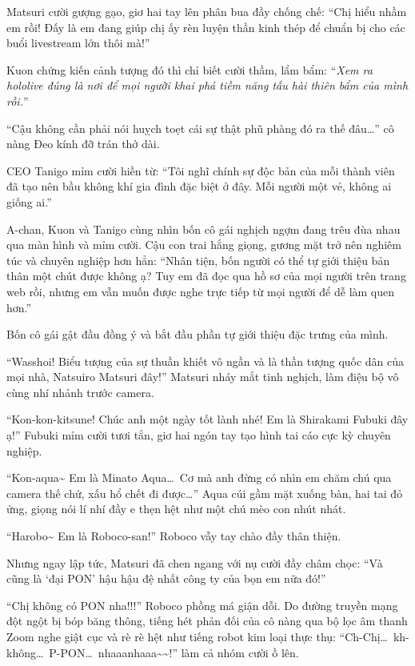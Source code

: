 \documentclass[../main.tex]{subfiles}
\begin{document}
Matsuri cười gượng gạo, giơ hai tay lên phân bua đầy chống chế: ``Chị hiểu nhầm em rồi! Đấy là em đang giúp chị ấy rèn luyện thần kinh thép để chuẩn bị cho các buổi livestream lớn thôi mà!''

Kuon chứng kiến cảnh tượng đó thì chỉ biết cười thầm, lẩm bẩm: ``\textit{Xem ra hololive đúng là nơi để mọi người khai phá tiềm năng tấu hài thiên bẩm của mình rồi.}''

``Cậu không cần phải nói huỵch toẹt cái sự thật phũ phàng đó ra thế đâu\dots'' cô nàng Đeo kính đỡ trán thở dài.

CEO Tanigo mỉm cười hiền từ: ``Tôi nghĩ chính sự độc bản của mỗi thành viên đã tạo nên bầu không khí gia đình đặc biệt ở đây. Mỗi người một vẻ, không ai giống ai.''

A-chan, Kuon và Tanigo cùng nhìn bốn cô gái nghịch ngợm đang trêu đùa nhau qua màn hình và mỉm cười. Cậu con trai hắng giọng, gương mặt trở nên nghiêm túc và chuyên nghiệp hơn hẳn: ``Nhân tiện, bốn người có thể tự giới thiệu bản thân một chút được không ạ? Tuy em đã đọc qua hồ sơ của mọi người trên trang web rồi, nhưng em vẫn muốn được nghe trực tiếp từ mọi người để dễ làm quen hơn.''

Bốn cô gái gật đầu đồng ý và bắt đầu phần tự giới thiệu đặc trưng của mình.

``Wasshoi! Biểu tượng của sự thuần khiết vô ngần và là thần tượng quốc dân của mọi nhà, Natsuiro Matsuri đây!'' Matsuri nháy mắt tinh nghịch, làm điệu bộ vô cùng nhí nhảnh trước camera.

``Kon-kon-kitsune! Chúc anh một ngày tốt lành nhé! Em là Shirakami Fubuki đây ạ!'' Fubuki mỉm cười tươi tắn, giơ hai ngón tay tạo hình tai cáo cực kỳ chuyên nghiệp.

``Kon-aqua\~{} Em là Minato Aqua\dots\ Cơ mà anh đừng có nhìn em chăm chú qua camera thế chứ, xấu hổ chết đi được\dots'' Aqua cúi gầm mặt xuống bàn, hai tai đỏ ửng, giọng nói lí nhí đầy e thẹn hệt như một chú mèo con nhút nhát.

``Harobo\~{} Em là Roboco-san!'' Roboco vẫy tay chào đầy thân thiện.

Nhưng ngay lập tức, Matsuri đã chen ngang với nụ cười đầy châm chọc: ``Và cũng là `đại PON' hậu hậu đệ nhất công ty của bọn em nữa đó!''

``Chị không có PON nha!!!'' Roboco phồng má giận dỗi. Do đường truyền mạng đột ngột bị bóp băng thông, tiếng hét phản đối của cô nàng qua bộ lọc âm thanh Zoom nghe giật cục và rè rè hệt như tiếng robot kim loại thực thụ: ``Ch-Chị\dots\ kh-không\dots\ P-PON\dots\ nhaaanhaaa\~{}\~{}!'' làm cả nhóm cười ồ lên.
\end{document}
